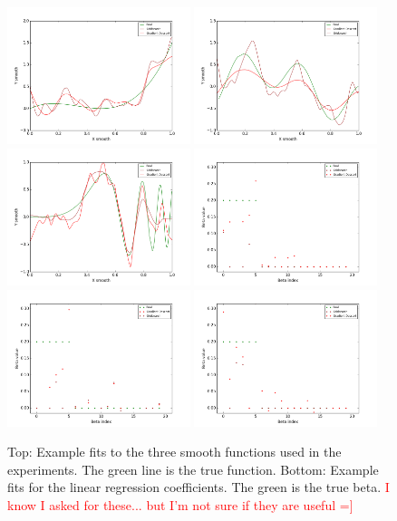 \documentclass[10pt,letterpaper]{article}
\begin{document}
\begin{figure}
\includegraphics[height=40mm]{smooth_linear_thetas_2_100_20_6.png}
\includegraphics[height=40mm]{smooth_linear_thetas_0_100_20_6.png}
\includegraphics[height=40mm]{smooth_linear_thetas_1_100_20_6.png}
\includegraphics[height=40mm]{smooth_linear_beta_2_100_20_6.png}
\includegraphics[height=40mm]{smooth_linear_beta_0_100_20_6.png}
\includegraphics[height=40mm]{smooth_linear_beta_1_100_20_6.png}
\caption{Top: Example fits to the three smooth functions used in the experiments. The green line is the true function. Bottom: Example fits for the linear regression coefficients. The green is the true beta. \textcolor{red}{I know I asked for these... but I'm not sure if they are useful =]}}
\label{fig:modelfits}
\end{figure}
\end{document}
